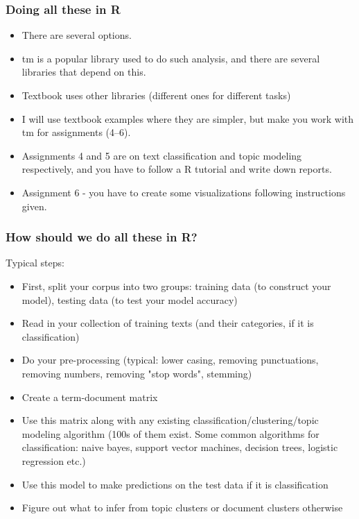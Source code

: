 \documentclass{beamer}
\begin{document}
\begin{frame}
\frametitle{Doing all these in R}
\begin{itemize}
\item There are several options.
\item tm is a popular library used to do such analysis, and there are several libraries that depend on this.
\item Textbook uses other libraries (different ones for different tasks)
\item I will use textbook examples where they are simpler, but make you work with tm for assignments (4--6). \pause
\item Assignments 4 and 5 are on text classification and topic modeling respectively, and you have to follow a R tutorial and write down reports.
\item Assignment 6 - you have to create some visualizations following instructions given. 
\end{itemize}
\end{frame}

\begin{frame}
\frametitle{How should we do all these in R?}
Typical steps: \small
\begin{itemize}
\item First, split your corpus into two groups: training data (to construct your model), testing data (to test your model accuracy)
\item Read in your collection of training texts (and their categories, if it is classification) \pause
\item Do your pre-processing (typical: lower casing, removing punctuations, removing numbers, removing "stop words", stemming) \pause
\item Create a term-document matrix \pause
\item Use this matrix along with any existing classification/clustering/topic modeling algorithm (100s of them exist. Some common algorithms for classification: naive bayes, support vector machines, decision trees, logistic regression etc.) \pause
\item Use this model to make predictions on the test data if it is classification
\item Figure out what to infer from topic clusters or document clusters otherwise
\end{itemize}
\end{frame}
\end{document}
